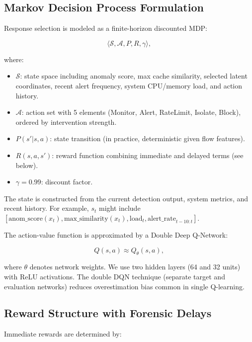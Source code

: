 \documentclass[preprint,12pt]{elsarticle}
\begin{document}
\subsection{Markov Decision Process Formulation}

Response selection is modeled as a finite-horizon discounted MDP:

\[
\langle \mathcal{S}, \mathcal{A}, P, R, \gamma \rangle,
\]

where:

\begin{itemize}[leftmargin=1.2em]
    \item $\mathcal{S}$: state space including anomaly score, max cache similarity, selected latent coordinates, recent alert frequency, system CPU/memory load, and action history.
    \item $\mathcal{A}$: action set with 5 elements (Monitor, Alert, RateLimit, Isolate, Block), ordered by intervention strength.
    \item $P(s'|s, a)$: state transition (in practice, deterministic given flow features).
    \item $R(s, a, s')$: reward function combining immediate and delayed terms (see below).
    \item $\gamma = 0.99$: discount factor.
\end{itemize}

The state is constructed from the current detection output, system metrics, and recent history. For example, $s_t$ might include $[\text{anom\_score}(x_t), \text{max\_similarity}(x_t), \text{load}_t, \text{alert\_rate}_{t-10:t}]$.

The action-value function is approximated by a Double Deep Q-Network:

\begin{equation}
Q(s, a) \approx Q_\theta(s, a),
\label{eq:ddqn}
\end{equation}

where $\theta$ denotes network weights. We use two hidden layers (64 and 32 units) with ReLU activations. The double DQN technique (separate target and evaluation networks) reduces overestimation bias common in single Q-learning.

\subsection{Reward Structure with Forensic Delays}

Immediate rewards are determined by:
\end{document}
